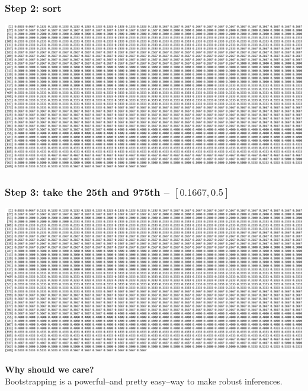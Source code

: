 \documentclass[aspectratio=169]{beamer}
\theoremstyle{principle}
\begin{document}
\begin{frame}
\frametitle{Step 2: sort}

\begin{center}
\includegraphics[scale=0.33]{numbers_sorted.png}
\end{center}

\end{frame}

\begin{frame}
\frametitle{Step 3: take the 25th and 975th -- $[0.1667,0.5]$}

\begin{center}
\includegraphics[scale=0.33]{numbers_sorted.png}
\end{center}

\end{frame}

\begin{frame}

\begin{center}
\Huge\textbf{Why should we care?}\\
\bigskip
\bigskip
\large Bootstrapping is a powerful--and pretty easy--way to make robust inferences.\\
\end{center}

\end{frame}
\end{document}
